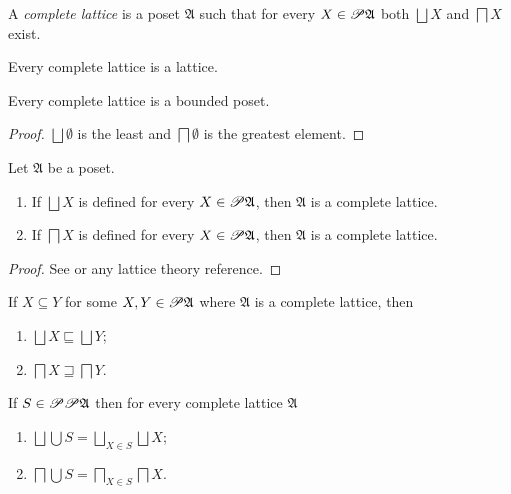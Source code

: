 \begin{defn}
A \emph{complete lattice} is a poset $\mathfrak{A}$
such that for every $X\in\mathscr{P}\mathfrak{A}$ both $\bigsqcup X$
and $\bigsqcap X$ exist.\end{defn}
\begin{obvious}
Every complete lattice is a lattice.\end{obvious}
\begin{prop}
Every complete lattice is a bounded poset.\end{prop}
\begin{proof}
$\bigsqcup\emptyset$ is the least and $\bigsqcap\emptyset$ is the
greatest element.\end{proof}
\begin{thm}
Let $\mathfrak{A}$ be a poset.
\begin{enumerate}
\item If $\bigsqcup X$ is defined for every $X\in\mathscr{P}\mathfrak{A}$,
then $\mathfrak{A}$ is a complete lattice.
\item If $\bigsqcap X$ is defined for every $X\in\mathscr{P}\mathfrak{A}$,
then $\mathfrak{A}$ is a complete lattice.
\end{enumerate}
\end{thm}
\begin{proof}
See \cite{pm:complete-lattice-criteria} or any lattice theory reference.\end{proof}
\begin{obvious}
If $X\subseteq Y$ for some $X,Y\in\mathscr{P}\mathfrak{A}$ where $\mathfrak{A}$
is a complete lattice, then
\begin{enumerate}
\item $\bigsqcup X\sqsubseteq\bigsqcup Y$;
\item $\bigsqcap X\sqsupseteq\bigsqcap Y$.
\end{enumerate}
\end{obvious}
\begin{prop}
If $S\in\mathscr{P}\mathscr{P}\mathfrak{A}$ then for every complete lattice
$\mathfrak{A}$
\begin{enumerate}
\item $\bigsqcup\bigcup S=\bigsqcup_{X\in S}\bigsqcup X$;
\item $\bigsqcap\bigcup S=\bigsqcap_{X\in S}\bigsqcap X$.
\end{enumerate}
\end{prop}
